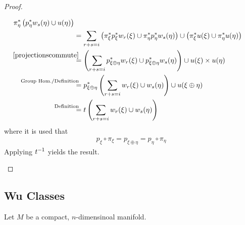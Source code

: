 \begin{Thm}
\begin{proof}
\begin{description}
\begin{align*}
          \pb\pi_\eta\left(\pb p_\eta \w_s(\eta) \cup \u(\eta)\right) \\
        &= \sum_{r+s=i}
          \left(
          \pb\pi_\xi \pb p_\xi \w_r(\xi) \cup
          \pb\pi_\eta\pb p_\eta\w_s(\eta)\right)
          \cup
          \left(\pb\pi_\xi\u(\xi) \cup \pb\pi_\eta\u(\eta)\right) \\
        &\overset{\mathllap{\eqref{projectionscommute}}} =
          \left(\sum_{r+s=i}
          \pb p_{\xi\oplus\eta} \w_r(\xi) \cup \pb p_{\xi\oplus\eta} \w_s(\eta)
          \right)
          \cup
          \u(\xi) \times \u(\eta) \\
        &\overset{\mathllap{\text{Group Hom./Definition}}}=
          \pb p_{\xi\oplus\eta}
          \left(\sum_{r+s=i}\w_r(\xi)\cup\w_s(\eta)\right)
          \cup
          \u(\xi\oplus\eta)\\
        &\overset{\mathllap{\text{Definition}}}=
          \thomiso\left(\sum_{r+s=i}\w_r(\xi)\cup\w_s(\eta)\right)
      \end{align*}
      where it is used that
      \begin{gather}\label{projectionscommute}
        p_\xi\circ\pi_\xi = p_{\xi\oplus\eta} = p_\eta\circ\pi_\eta
      \end{gather}
      Applying $t^{-1}$ yields the result.
      \qedhere
    \end{description}
  \end{proof}
\end{Thm}

\subsection{Wu Classes}
Let $M$ be a compact, $n$-dimensinoal manifold.

